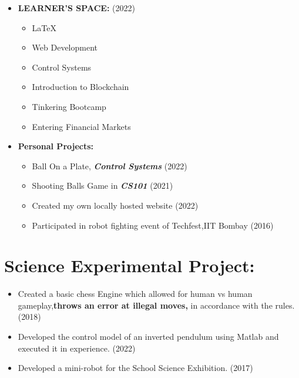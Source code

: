 \documentclass{article}
\begin{document}
\begin{itemize}
    \item \textbf{LEARNER'S SPACE: } \hfill{(2022)}\begin{itemize}
        \item \LaTeX{}
        \item Web Development
        \item Control Systems
        \item Introduction to Blockchain
        \item Tinkering Bootcamp
        \item Entering Financial Markets
    \end{itemize}
    \item \textbf{Personal Projects: }\begin{itemize}
        \item Ball On a Plate, \textbf{\textit{Control Systems}} \hfill{(2022)}
        \item Shooting Balls Game in \textbf{\textit{CS101}} \hfill{(2021)}
        \item Created my own locally hosted website  \hfill{(2022)}
    \item Participated in robot fighting event of Techfest,IIT Bombay \hfill{(2016)}
    \end{itemize}
\end{itemize}

\newgeometry{}

\thispagestyle{fancy}

\fancyhf{}





\section*{\color{blue!60!black}Science Experimental Project: }


\begin{itemize}
    \item Created a basic chess Engine which allowed for human vs human gameplay,\textbf{throws an error at illegal moves, }in accordance with the rules. \hfill{(2018)}
    \item Developed the control model of an inverted pendulum using Matlab and executed it in experience. \hfill{(2022)}
    \item Developed a mini-robot for the School Science Exhibition. \hfill{(2017)}
\end{itemize}
\end{document}
